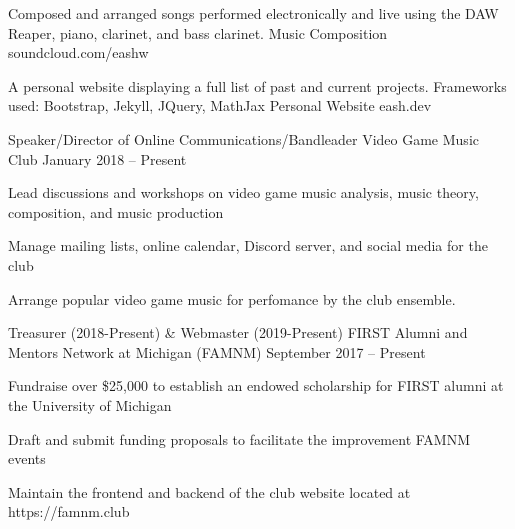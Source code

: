 \documentclass[]{awesome-cv}
\begin{document}

	
	\vspace{-6mm}
	\cventry
	{Composed and arranged songs performed electronically and live using the DAW Reaper, piano, clarinet, and bass clarinet.}
	{Music Composition}
	{soundcloud.com/eashw}
	{}
	{}
	
	\vspace{-6mm}
	\cventry
	{A personal website displaying a full list of past and current projects. Frameworks used: Bootstrap, Jekyll, JQuery, MathJax}
	{Personal Website}
	{eash.dev}
	{}
	{}
	
	\vspace{-5mm}

\vspace{-2mm}
\vspace{-2mm}
	\cventry
	{Speaker/Director of Online Communications/Bandleader}
	{Video Game Music Club}
	{}
	{January 2018 – Present}
	{\begin{cvitems}
		\item {Lead discussions and workshops on video game music analysis, music theory, composition, and music production}
		\item {Manage mailing lists, online calendar, Discord server, and social media for the club}
		\item {Arrange popular video game music for perfomance by the club ensemble.}
		\end{cvitems}}

	\vspace{-4mm}
	\cventry
	{Treasurer (2018-Present) \& Webmaster (2019-Present)}
	{FIRST Alumni and Mentors Network at Michigan (FAMNM)}
	{}
	{September 2017 – Present}
	{\begin{cvitems}
		\item {Fundraise over \$25,000 to establish an endowed scholarship for FIRST alumni at the University of Michigan}
		\item {Draft and submit funding proposals to facilitate the improvement FAMNM events}
		\item {Maintain the frontend and backend of the club website located at https://famnm.club}
		\end{cvitems}}
	
\end{document}
